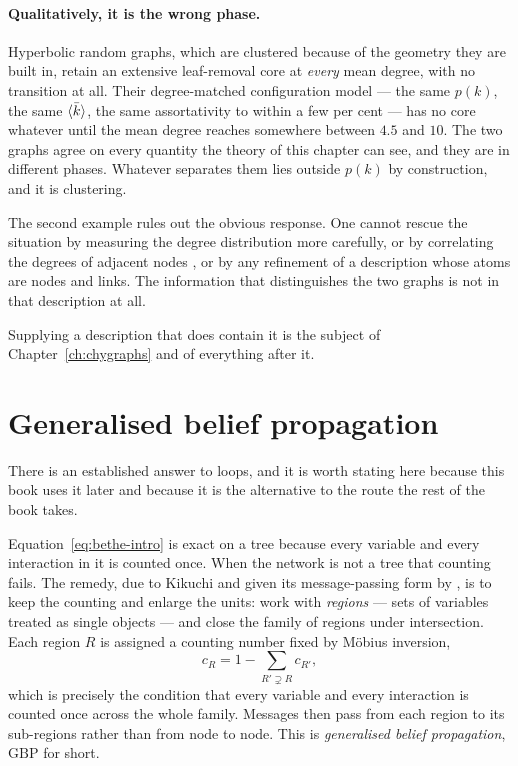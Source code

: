 \paragraph{Qualitatively, it is the wrong phase.} Hyperbolic random graphs, which
are clustered because of the geometry they are built in, retain an extensive
leaf-removal core at \emph{every} mean degree, with no transition at all. Their
degree-matched configuration model --- the same $p(k)$, the same $\langle \bar k \rangle$,
the same assortativity to within a few per cent --- has no core whatever until
the mean degree reaches somewhere between $4.5$ and $10$. The two graphs agree
on every quantity the theory of this chapter can see, and they are in different
phases. Whatever separates them lies outside $p(k)$ by construction, and it is
clustering.

The second example rules out the obvious response. One cannot rescue the situation by measuring the degree distribution
more carefully, or by correlating the degrees of adjacent nodes
\citep{vazquez2003vw}, or by any refinement of a description whose atoms are
nodes and links. The
information that distinguishes the two graphs is not in that description at all.

Supplying a description that does contain it is the subject of
Chapter~\ref{ch:chygraphs} and of everything after it.

\section{Generalised belief propagation}
\label{sec:gbp-intro}

There is an established answer to loops, and it is worth stating here because
this book uses it later and because it is the alternative to the route the rest
of the book takes.

Equation~\eqref{eq:bethe-intro} is exact on a tree because every variable and
every interaction in it is counted once. When the network is not a tree that
counting fails. The remedy, due to Kikuchi and given its message-passing form by
\citet{yedidia2005}, is to keep the counting and enlarge the units: work with \emph{regions} --- sets of
variables treated as single objects --- and close the family of regions under
intersection. Each region $R$ is assigned a counting number fixed by
M\"obius inversion,
\begin{equation}
  c_{R}=1-\sum_{R'\supsetneq R}c_{R'},
  \label{eq:mobius-intro}
\end{equation}
which is precisely the condition that every variable and every interaction is
counted once across the whole family. Messages then pass from each region to its
sub-regions rather than from node to node. This is \emph{generalised belief
propagation}, $\mathrm{GBP}$ for short.


